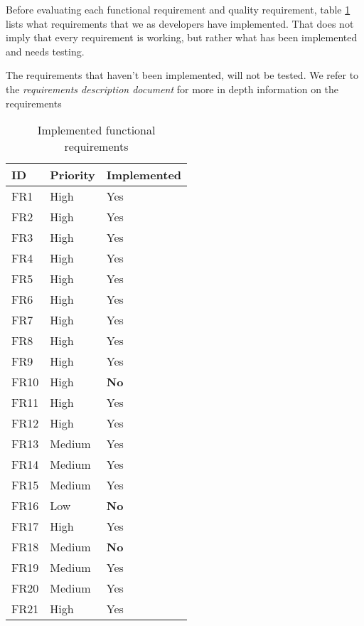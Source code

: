 Before evaluating each functional requirement and quality requirement, table \ref{tab:implemented_reqs} lists what requirements that we as developers have implemented. That does not imply that every requirement is working, but rather what has been implemented and needs testing. 

The requirements that haven't been implemented, will not be tested. We refer to the \emph{requirements description document} for more in depth information on the requirements

\begin{table}[H]
	\begin{center}
	\begin{tabular}{p{2cm} | p{2cm} | p{4cm}}
    	\hline
		\textbf{ID} 			& 	\textbf{Priority}	&	\textbf{Implemented}\\ 
		\hline
		FR1			&	High				&	Yes						\\
		FR2			& 	High				& 	Yes						\\
		FR3			& 	High 				& 	Yes						\\
		FR4			&	High				& 	Yes 					\\
		FR5			& 	High				& 	Yes						\\
		FR6			& 	High				& 	Yes						\\
		FR7			& 	High				& 	Yes						\\
		FR8			&	High				&	Yes						\\
		FR9			&	High				& 	Yes						\\
		FR10		&	High				& 	\textbf{No} 			\\
		FR11		&	High				&	Yes\*					\\
		FR12		&	High				&	Yes						\\
		FR13		&	Medium				&	Yes						\\
		FR14		&	Medium				& 	Yes						\\
		FR15		&	Medium				& 	Yes						\\
		FR16		&	Low					&	\textbf{No}				\\
		FR17		&	High				&	Yes						\\
		FR18		&	Medium				& 	\textbf{No}				\\
		FR19		&	Medium				&	Yes						\\
		FR20		&	Medium				&	Yes						\\
		FR21		&	High				&	Yes						\\
		\hline
    \end{tabular}
\end{center}
	\caption{Implemented functional requirements}
	\label{tab:implemented_reqs}
\end{table}

